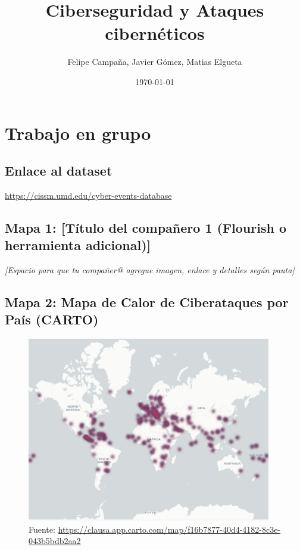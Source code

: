 \documentclass[12pt, a4paper]{article}
\title{Ciberseguridad y Ataques cibernéticos}
\author{Felipe Campaña, Javier Gómez, Matias Elgueta}
\date{\today\\[2cm]}
\begin{document}
\maketitle

\vspace*{0.3cm}
\begin{figure}[H]
    \centering
    \begin{minipage}[t]{0.45\linewidth}
    \end{minipage}
    \hfill
    \begin{minipage}[t]{0.45\linewidth}
    \end{minipage}
\end{figure}

\section*{Trabajo en grupo}

\subsection*{Enlace al dataset}
\url{https://cissm.umd.edu/cyber-events-database}

\vspace{1em}
\subsection*{Mapa 1: [Título del compañero 1 (Flourish o herramienta adicional)]}
\textit{[Espacio para que tu compañer@ agregue imagen, enlace y detalles según pauta]}

\subsection*{Mapa 2: Mapa de Calor de Ciberataques por País (CARTO)}

\begin{figure}[H]
    \centering
    \includegraphics[width=0.95\textwidth]{images/Mapa_calor_FC.png}
    \caption[1]{Fuente: \url{https://clausa.app.carto.com/map/f16b7877-40d4-4182-8c3e-043b5bdb2aa2}}
\end{figure}
\end{document}

